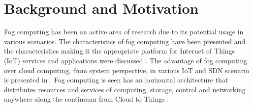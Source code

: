 \documentclass[10pt,journal,compsoc]{IEEEtran}
\begin{document}
\section{Background and Motivation}
Fog computing has been an active area of research due to its potential usage in various scenarios. The characteristics of fog computing have been presented and the characteristics making it the appropriate platform for Internet of Things (IoT) services and applications were discussed \cite{Bonomi:2012:FCR:2342509.2342513, momentum}. The advantage of fog computing over cloud computing, from system perspective, in various IoT and SDN scenario is presented in \cite{fcp}. Fog computing is seen has an horizontal architecture that distributes resources and services of computing, storage, control and networking anywhere along the continuum from Cloud to Things \cite{openfog}. %

\end{document}
